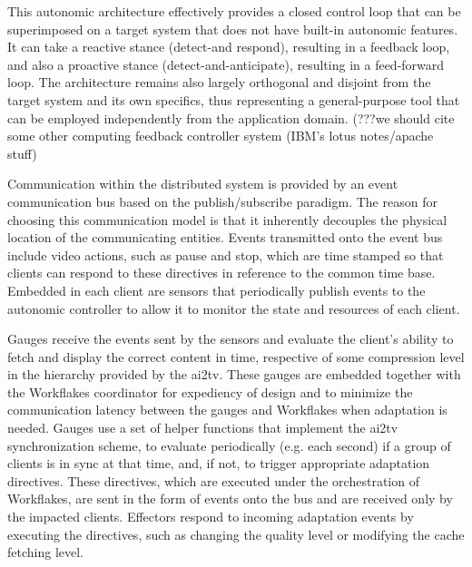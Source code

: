 \documentclass{sig-alternate}
\begin{document}
This autonomic architecture effectively provides a closed control loop
that can be superimposed on a target system that does not have
built-in autonomic features.  It can take a reactive stance
(detect-and respond), resulting in a feedback loop, and also a
proactive stance (detect-and-anticipate), resulting in a feed-forward
loop.  The architecture remains also largely orthogonal and disjoint
from the target system and its own specifics, thus representing a
general-purpose tool that can be employed independently from the
application domain. (???we should cite some other computing feedback
controller system (IBM's lotus notes/apache stuff)


Communication within the distributed system is provided by an event
communication bus based on the publish/subscribe paradigm.  The reason
for choosing this communication model is that it inherently decouples
the physical location of the communicating entities.  Events
transmitted onto the event bus include video actions, such as pause
and stop, which are time stamped so that clients can respond to these
directives in reference to the common time base.  Embedded in each
client are sensors that periodically publish events to the autonomic
controller to allow it to monitor the state and resources of each
client.

%
Gauges receive the events sent by the sensors and evaluate the
client's ability to fetch and display the correct content in time,
respective of some compression level in the hierarchy provided by the
ai2tv.  These gauges are embedded together with the Workflakes
coordinator for expediency of design and to minimize the communication
latency between the gauges and Workflakes when adaptation is needed.
Gauges use a set of helper functions that implement the ai2tv
synchronization scheme, to evaluate periodically (e.g. each second) if
a group of clients is in sync at that time, and, if not, to trigger
appropriate adaptation directives.  These directives, which are
executed under the orchestration of Workflakes, are sent in the form
of events onto the bus and are received only by the impacted clients.
Effectors respond to incoming adaptation events by executing the
directives, such as changing the quality level or modifying the cache
fetching level.
\end{document}
